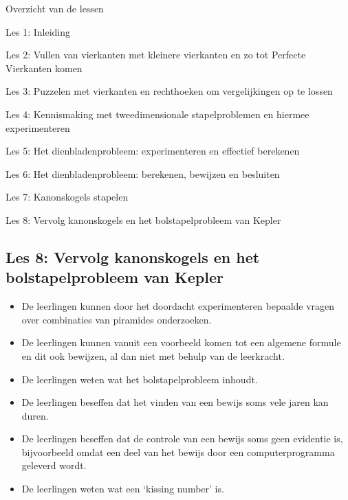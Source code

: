 \documentclass[dutch]{beamer}
\begin{document}
\begin{frame}
{Overzicht van de lessen}
\begin{list}{\quad}{}
\item Les 1: Inleiding
\item Les 2: Vullen van vierkanten met kleinere vierkanten en zo tot Perfecte Vierkanten komen
\item Les 3: Puzzelen met vierkanten en rechthoeken om vergelijkingen op te lossen
\item Les 4: Kennismaking met tweedimensionale stapelproblemen en hiermee experimenteren
\item Les 5: Het dienbladenprobleem: experimenteren en effectief berekenen
\item Les 6: Het dienbladenprobleem: berekenen, bewijzen en besluiten
\item Les 7: Kanonskogels stapelen
\item {\color{blue}Les 8: Vervolg kanonskogels en het bolstapelprobleem van Kepler}
\end{list}
\end{frame}

\subsection{Les 8: Vervolg kanonskogels en het bolstapelprobleem van Kepler}

\begin{frame}
\begin{itemize}
\item De leerlingen kunnen door het doordacht experimenteren bepaalde vragen over combinaties van piramides onderzoeken.
\item De leerlingen kunnen vanuit een voorbeeld komen tot een algemene formule en dit ook bewijzen, al dan niet met behulp van de leerkracht.
\item De leerlingen weten wat het bolstapelprobleem inhoudt.
\item De leerlingen beseffen dat het vinden van een bewijs soms vele jaren kan duren.
\item De leerlingen beseffen dat de controle van een bewijs soms geen evidentie is, bijvoorbeeld omdat een deel van het bewijs door een computerprogramma geleverd wordt.
\item De leerlingen weten wat een `kissing number' is.
\end{itemize}
\end{frame}


\end{document}

